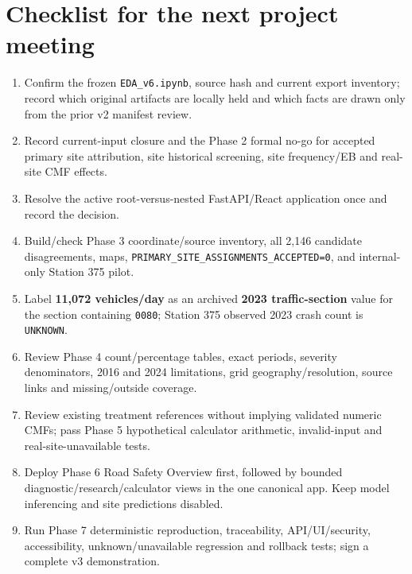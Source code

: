\documentclass[11pt,a4paper,openany]{report}
\newcommand{\pathcode}[1]{\nolinkurl{#1}}
\begin{document}
\section{Checklist for the next project meeting}
\begin{enumerate}
\item Confirm the frozen \pathcode{EDA_v6.ipynb}, source hash and current export inventory; record which original artifacts are locally held and which facts are drawn only from the prior v2 manifest review.
\item Record current-input closure and the Phase 2 formal no-go for accepted primary site attribution, site historical screening, site frequency/EB and real-site CMF effects.
\item Resolve the active root-versus-nested FastAPI/React application once and record the decision.
\item Build/check Phase 3 coordinate/source inventory, all 2,146 candidate disagreements, maps, \pathcode{PRIMARY_SITE_ASSIGNMENTS_ACCEPTED=0}, and internal-only Station 375 pilot.
\item Label \textbf{11,072 vehicles/day} as an archived \textbf{2023 traffic-section} value for the section containing \pathcode{0080}; Station 375 observed 2023 crash count is \pathcode{UNKNOWN}.
\item Review Phase 4 count/percentage tables, exact periods, severity denominators, 2016 and 2024 limitations, grid geography/resolution, source links and missing/outside coverage.
\item Review existing treatment references without implying validated numeric CMFs; pass Phase 5 hypothetical calculator arithmetic, invalid-input and real-site-unavailable tests.
\item Deploy Phase 6 Road Safety Overview first, followed by bounded diagnostic/research/calculator views in the one canonical app. Keep model inferencing and site predictions disabled.
\item Run Phase 7 deterministic reproduction, traceability, API/UI/security, accessibility, unknown/unavailable regression and rollback tests; sign a complete v3 demonstration.
\end{enumerate}
\end{document}
